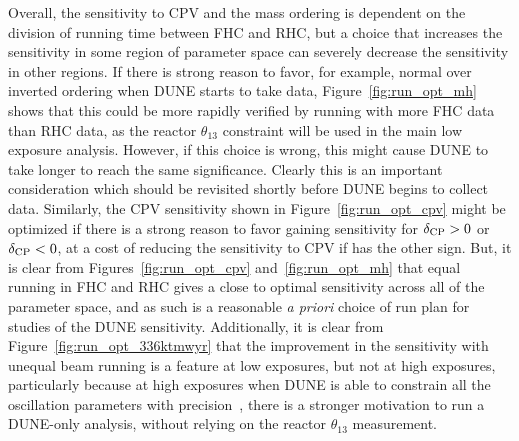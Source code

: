 Overall, the sensitivity to CPV and the mass ordering is dependent on the division of running time between FHC and RHC, but a choice that increases the sensitivity in some region of parameter space can severely decrease the sensitivity in other regions. If there is strong reason to favor, for example, normal over inverted ordering when DUNE starts to take data, Figure~\ref{fig:run_opt_mh} shows that this could be more rapidly verified by running with more FHC data than RHC data, as the reactor $\theta_{13}$ constraint will be used in the main low exposure analysis. However, if this choice is wrong, this might cause DUNE to take longer to reach the same significance. Clearly this is an important consideration which should be revisited shortly before DUNE begins to collect data. Similarly, the CPV sensitivity shown in Figure~\ref{fig:run_opt_cpv} might be optimized if there is a strong reason to favor gaining sensitivity for $\delta_{\rm CP} > 0$ or $\delta_{\rm CP} < 0$, at a cost of reducing the sensitivity to CPV if \deltacp has the other sign. But, it is clear from Figures~\ref{fig:run_opt_cpv} and~\ref{fig:run_opt_mh} that equal running in FHC and RHC gives a close to optimal sensitivity across all of the parameter space, and as such is a reasonable {\it a priori} choice of run plan for studies of the DUNE sensitivity. Additionally, it is clear from Figure~\ref{fig:run_opt_336ktmwyr} that the improvement in the sensitivity with unequal beam running is a feature at low exposures, but not at high exposures, particularly because at high exposures when DUNE is able to constrain all the oscillation parameters with precision~\cite{Abi:2020qib}, there is a stronger motivation to run a DUNE-only analysis, without relying on the reactor $\theta_{13}$ measurement.


